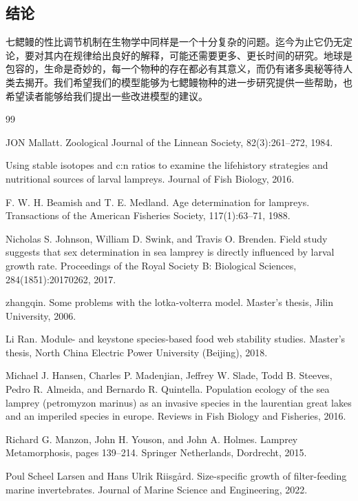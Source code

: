 \documentclass[11pt,a4paper]{ctexart}
\begin{document}
\subsection{结论}

七鳃鳗的性比调节机制在生物学中同样是一个十分复杂的问题。迄今为止它仍无定论，要对其内在规律给出良好的解释，可能还需要更多、更长时间的研究。地球是包容的，生命是奇妙的，每一个物种的存在都必有其意义，而仍有诸多奥秘等待人类去揭开。我们希望我们的模型能够为七鳃鳗物种的进一步研究提供一些帮助，也希望读者能够给我们提出一些改进模型的建议。

\begin{thebibliography}{99}

 JON Mallatt. Zoological Journal of the Linnean Society, 82(3):261--272, 1984.

 Using stable isotopes and c:n ratios to examine the lifehistory strategies and nutritional sources of larval lampreys. Journal of Fish Biology, 2016.

 F. W. H. Beamish and T. E. Medland. Age determination for lampreys. Transactions of the American Fisheries Society, 117(1):63--71, 1988.

 Nicholas S. Johnson, William D. Swink, and Travis O. Brenden. Field study suggests that sex determination in sea lamprey is directly influenced by larval growth rate. Proceedings of the Royal Society B: Biological Sciences, 284(1851):20170262, 2017.

 zhangqin. Some problems with the lotka-volterra model. Master's thesis, Jilin University, 2006.

 Li Ran. Module- and keystone species-based food web stability studies. Master's thesis, North China Electric Power University (Beijing), 2018.

 Michael J. Hansen, Charles P. Madenjian, Jeffrey W. Slade, Todd B. Steeves, Pedro R. Almeida, and Bernardo R. Quintella. Population ecology of the sea lamprey (petromyzon marinus) as an invasive species in the laurentian great lakes and an imperiled species in europe. Reviews in Fish Biology and Fisheries, 2016.

 Richard G. Manzon, John H. Youson, and John A. Holmes. Lamprey Metamorphosis, pages 139--214. Springer Netherlands, Dordrecht, 2015.

 Poul Scheel Larsen and Hans Ulrik Riisg\aa rd. Size-specific growth of filter-feeding marine invertebrates. Journal of Marine Science and Engineering, 2022.


\end{thebibliography}
\end{document}
